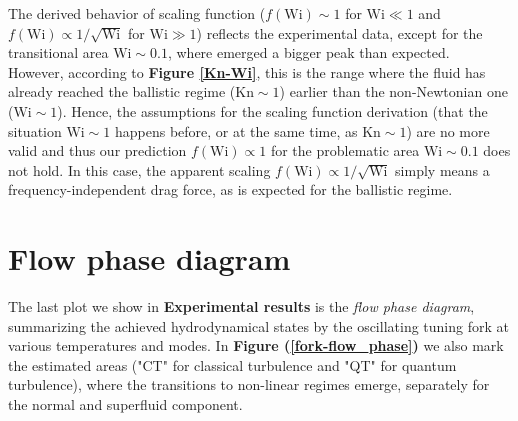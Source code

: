The derived behavior of scaling function ($f(\text{Wi}) \sim 1$ for $\text{Wi} \ll 1$ and $f(\text{Wi}) \propto 1/\sqrt{\text{Wi}}$ for $\text{Wi} \gg 1$) reflects the experimental data, except for the transitional area $\text{Wi} \sim 0.1 $, where emerged a bigger peak than expected.\\
However, according to \textbf{Figure \ref{Kn-Wi}}, this is the range where the fluid has already reached the ballistic regime ($\text{Kn} \sim 1$) earlier than the non-Newtonian one ($\text{Wi} \sim 1$).
Hence, the assumptions for the scaling function derivation (that the situation $\text{Wi} \sim 1$ happens before, or at the same time, as $\text{Kn} \sim 1$) are no more valid and thus our prediction $f(\text{Wi}) \propto 1$ for the problematic area $\text{Wi} \sim 0.1$ does not hold.
In this case, the apparent scaling $f(\text{Wi}) \propto 1/\sqrt{\text{Wi}}$ simply means a frequency-independent drag force, as is expected for the ballistic regime.

\section{Flow phase diagram}

The last plot we show in \textbf{Experimental results} is the \textit{flow phase diagram}, summarizing the achieved hydrodynamical states by the oscillating tuning fork at various temperatures and modes. In \textbf{Figure (\ref{fork-flow_phase})} we also mark the estimated areas ("CT" for classical turbulence and "QT" for quantum turbulence), where the transitions to non-linear regimes emerge, separately for the normal and superfluid component.

